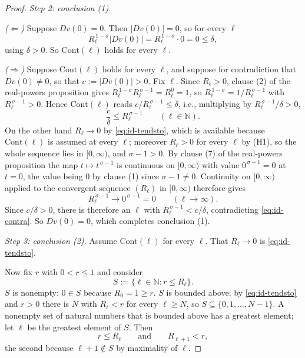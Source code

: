 \begin{proof}
\medskip\noindent\emph{Step 2: conclusion (1).}

\emph{($\Leftarrow$)}  Suppose $Dv(0)=0$.  Then $\lvert Dv(0)\rvert=0$, so for every $\ell$
\[
  R_\ell^{\,1-\sigma}\lvert Dv(0)\rvert=R_\ell^{\,1-\sigma}\cdot0=0\le\delta,
\]
using $\delta>0$.  So $\mathrm{Cont}(\ell)$ holds for every $\ell$.

\emph{($\Rightarrow$)}  Suppose $\mathrm{Cont}(\ell)$ holds for every $\ell$, and suppose for
contradiction that $Dv(0)\ne0$, so that $c:=\lvert Dv(0)\rvert>0$.  Fix $\ell$.  Since
$R_\ell>0$, clause (2) of the real-powers proposition gives
$R_\ell^{\,1-\sigma}R_\ell^{\,\sigma-1}=R_\ell^{0}=1$, so
$R_\ell^{\,1-\sigma}=1/R_\ell^{\,\sigma-1}$ with $R_\ell^{\,\sigma-1}>0$.  Hence
$\mathrm{Cont}(\ell)$ reads $c/R_\ell^{\,\sigma-1}\le\delta$, i.e., multiplying by
$R_\ell^{\,\sigma-1}/\delta>0$,
\begin{equation}\label{eq:id-contra}
  \frac{c}{\delta}\le R_\ell^{\,\sigma-1}\qquad(\ell\in\mathbb{N}).
\end{equation}
On the other hand $R_\ell\to0$ by \eqref{eq:id-tendsto}, which is available because
$\mathrm{Cont}(\ell)$ is assumed at every $\ell$; moreover $R_\ell>0$ for every $\ell$ by (H1),
so the whole sequence lies in $[0,\infty)$, and $\sigma-1>0$.  By clause (7) of the real-powers
proposition the map $t\mapsto t^{\,\sigma-1}$ is continuous on $[0,\infty)$ with value
$0^{\,\sigma-1}=0$ at $t=0$, the value being $0$ by clause (1) since $\sigma-1\neq0$.  Continuity
on $[0,\infty)$ applied to the convergent sequence $(R_\ell)$ in $[0,\infty)$ therefore gives
\[
  R_\ell^{\,\sigma-1}\longrightarrow0^{\,\sigma-1}=0\qquad(\ell\to\infty).
\]
Since $c/\delta>0$, there is therefore an $\ell$ with $R_\ell^{\,\sigma-1}<c/\delta$,
contradicting \eqref{eq:id-contra}.  So $Dv(0)=0$, which completes conclusion (1).

\medskip\noindent\emph{Step 3: conclusion (2).}
Assume $\mathrm{Cont}(\ell)$ for every $\ell$.  That $R_\ell\to0$ is \eqref{eq:id-tendsto}.

Now fix $r$ with $0<r\le1$ and consider
\[
  S:=\{\ell\in\mathbb{N}:r\le R_\ell\}.
\]
$S$ is nonempty: $0\in S$ because $R_0=1\ge r$.  $S$ is bounded above: by
\eqref{eq:id-tendsto} and $r>0$ there is $N$ with $R_\ell<r$ for every $\ell\ge N$, so
$S\subseteq\{0,1,\ldots,N-1\}$.  A nonempty set of natural numbers that is bounded above has a
greatest element; let $\ell$ be the greatest element of $S$.  Then
\begin{equation}\label{eq:id-bracket}
  r\le R_\ell\qquad\text{and}\qquad R_{\ell+1}<r,
\end{equation}
the second because $\ell+1\notin S$ by maximality of $\ell$.


\end{proof}
